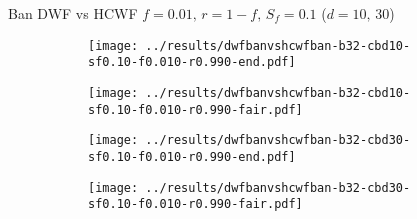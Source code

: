 \documentclass[8pt,a4paper]{beamer}
\begin{document}
	\begin{frame}{Ban DWF vs HCWF $f=0.01,\, r=1-f,\,S_f=0.1$ ($d=10,\, 30$)}
		\begin{figure}
			\begin{subfigure}{.48\textwidth}
				\centering
				\texttt{[image: ../results/dwfbanvshcwfban-b32-cbd10-sf0.10-f0.010-r0.990-end.pdf]}
			\end{subfigure}
			\begin{subfigure}{.48\textwidth}
				\centering
				\texttt{[image: ../results/dwfbanvshcwfban-b32-cbd10-sf0.10-f0.010-r0.990-fair.pdf]}
			\end{subfigure}
		\end{figure}
		
		\begin{figure}
			\begin{subfigure}{.48\textwidth}
				\centering
				\texttt{[image: ../results/dwfbanvshcwfban-b32-cbd30-sf0.10-f0.010-r0.990-end.pdf]}
			\end{subfigure}
			\begin{subfigure}{.48\textwidth}
				\centering
				\texttt{[image: ../results/dwfbanvshcwfban-b32-cbd30-sf0.10-f0.010-r0.990-fair.pdf]}
			\end{subfigure}
		\end{figure}
	\end{frame}

	
\end{document}
